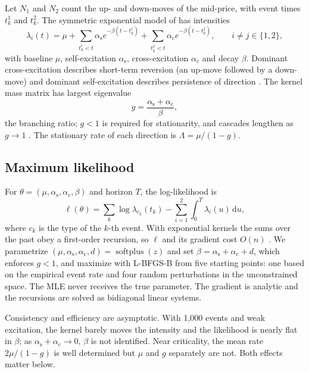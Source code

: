 \documentclass[preprint,12pt,authoryear]{elsarticle}
\newcommand{\aself}{\alpha_{\mathrm{s}}}
\newcommand{\across}{\alpha_{\mathrm{c}}}
\DeclareMathOperator{\softplus}{softplus}
\begin{document}
Let $N_1$ and $N_2$ count the up- and down-moves of the mid-price, with event times
$t^1_k$ and $t^2_k$. The symmetric exponential model of \citet{lee2023} has intensities
\begin{equation}
\lambda_i(t)=\mu+\sum_{t^i_k<t}\aself e^{-\beta(t-t^i_k)}
  +\sum_{t^j_k<t}\across e^{-\beta(t-t^j_k)},\qquad i\neq j\in\{1,2\},
\label{eq:intensity}
\end{equation}
with baseline $\mu$, self-excitation $\aself$, cross-excitation $\across$ and decay $\beta$.
Dominant cross-excitation describes short-term reversion (an up-move followed by a
down-move) and dominant self-excitation describes persistence of direction
\citep{bacry2013}. The kernel mass matrix has largest eigenvalue
\begin{equation}
g=\frac{\aself+\across}{\beta},
\end{equation}
the branching ratio; $g<1$ is required for stationarity, and cascades lengthen as $g\to1$
\citep{hardiman2013,filimonov2012}. The stationary rate of each direction is
$\Lambda=\mu/(1-g)$.

\subsection{Maximum likelihood}

For $\theta=(\mu,\aself,\across,\beta)$ and horizon $T$, the log-likelihood is
\begin{equation}
\ell(\theta)=\sum_k\log\lambda_{c_k}(t_k)-\sum_{i=1}^{2}\int_0^T\lambda_i(u)\,\mathrm du,
\end{equation}
where $c_k$ is the type of the $k$-th event. With exponential kernels the sums over the past
obey a first-order recursion, so $\ell$ and its gradient cost $O(n)$ \citep{ozaki1979}. We
parametrize $(\mu,\aself,\across,d)=\softplus(z)$ and set $\beta=\aself+\across+d$, which
enforces $g<1$, and maximize with L-BFGS-B from five starting points: one based on the
empirical event rate and four random perturbations in the unconstrained space. The MLE never
receives the true parameter. The gradient is analytic and the recursions are solved as
bidiagonal linear systems.

Consistency and efficiency are asymptotic. With 1,000 events and weak excitation, the kernel
barely moves the intensity and the likelihood is nearly flat in $\beta$; as
$\aself+\across\to0$, $\beta$ is not identified. Near criticality, the mean rate $2\mu/(1-g)$
is well determined but $\mu$ and $g$ separately are not. Both effects matter below.
\end{document}
